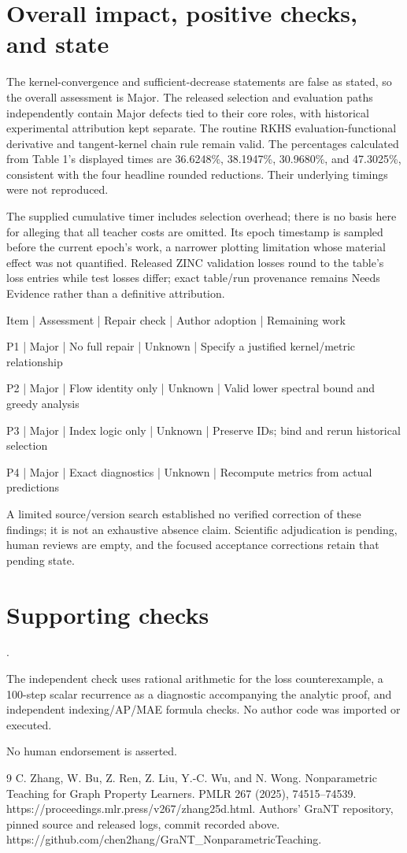 \documentclass[10pt]{article}
\begin{document}
\section*{Overall impact, positive checks, and state}
The kernel-convergence and sufficient-decrease statements are false as stated, so the overall assessment is Major. The released selection and evaluation paths independently contain Major defects tied to their core roles, with historical experimental attribution kept separate. The routine RKHS evaluation-functional derivative and tangent-kernel chain rule remain valid. The percentages calculated from Table 1’s displayed times are 36.6248\%, 38.1947\%, 30.9680\%, and 47.3025\%, consistent with the four headline rounded reductions. Their underlying timings were not reproduced.\par
The supplied cumulative timer includes selection overhead; there is no basis here for alleging that all teacher costs are omitted. Its epoch timestamp is sampled before the current epoch’s work, a narrower plotting limitation whose material effect was not quantified. Released ZINC validation losses round to the table’s loss entries while test losses differ; exact table/run provenance remains Needs Evidence rather than a definitive attribution.\par
Item | Assessment | Repair check | Author adoption | Remaining work\par
P1 | Major | No full repair | Unknown | Specify a justified kernel/metric relationship\par
P2 | Major | Flow identity only | Unknown | Valid lower spectral bound and greedy analysis\par
P3 | Major | Index logic only | Unknown | Preserve IDs; bind and rerun historical selection\par
P4 | Major | Exact diagnostics | Unknown | Recompute metrics from actual predictions\par
A limited source/version search established no verified correction of these findings; it is not an exhaustive absence claim. Scientific adjudication is pending, human reviews are empty, and the focused acceptance corrections retain that pending state.\par
\section*{Supporting checks}
.\par
The independent check uses rational arithmetic for the loss counterexample, a 100-step scalar recurrence as a diagnostic accompanying the analytic proof, and independent indexing/AP/MAE formula checks. No author code was imported or executed.\par
No human endorsement is asserted.\par
9 C. Zhang, W. Bu, Z. Ren, Z. Liu, Y.-C. Wu, and N. Wong. Nonparametric Teaching for Graph Property Learners. PMLR 267 (2025), 74515–74539. https://proceedings.mlr.press/v267/zhang25d.html. Authors’ GraNT repository, pinned source and released logs, commit recorded above. https://github.com/chen2hang/GraNT\_NonparametricTeaching.\par
\end{document}
